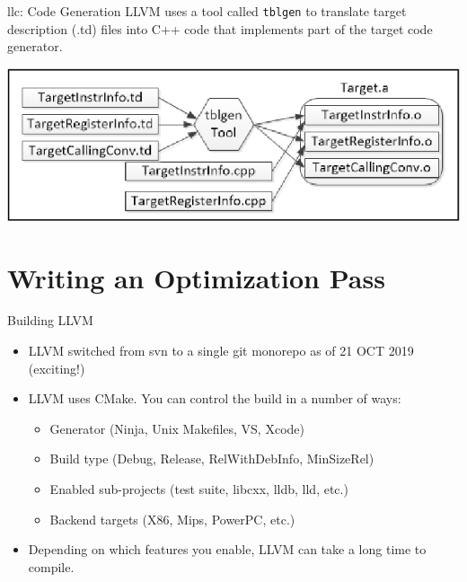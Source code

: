 \documentclass{beamer}
\begin{document}
\begin{frame}{llc: Code Generation}
    LLVM uses a tool called \texttt{tblgen} to translate target description (.td) files into C++ code that implements part of the target code generator.

    \vspace{1em}
    \includegraphics[width=\textwidth]{images/llvm_tblgen.png}
\end{frame}


\section{Writing an Optimization Pass}


\begin{frame}{Building LLVM}
    \begin{itemize}
        \item LLVM switched from svn to a single git monorepo as of 21 OCT 2019 (exciting!)
        \item LLVM uses CMake. You can control the build in a number of ways:
        \begin{itemize}
            \item Generator (Ninja, Unix Makefiles, VS, Xcode)
            \item Build type (Debug, Release, RelWithDebInfo, MinSizeRel)
            \item Enabled sub-projects (test suite, libcxx, lldb, lld, etc.)
            \item Backend targets (X86, Mips, PowerPC, etc.)
        \end{itemize}
        \item Depending on which features you enable, LLVM can take a long time to compile.
    \end{itemize}
\end{frame}
\end{document}
